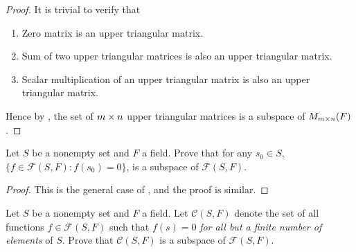 \begin{proof}
It is trivial to verify that
\begin{enumerate}
    \item Zero matrix is an upper triangular matrix.
    \item Sum of two upper triangular matrices is also an upper triangular matrix.
    \item Scalar multiplication of an upper triangular matrix is also an upper triangular matrix.
\end{enumerate}
Hence by , the set of \(m \times n\) upper triangular matrices is a subspace of \(M_{m \times n}(F)\).
\end{proof}

\begin{exercise} \label{exercise 1.3.13}
Let \(S\) be a nonempty set and \(F\) a field.
Prove that for any \(s_0 \in S\), \(\{ f \in \mathcal{F}(S, F) : f(s_0) = 0\}\), is a subspace of \(\mathcal{F}(S, F)\).
\end{exercise}

\begin{proof}
This is the general case of , and the proof is similar.
\end{proof}

\begin{exercise} \label{exercise 1.3.14}
Let \(S\) be a nonempty set and \(F\) a field.
Let \(\mathcal{C}(S, F)\) denote the set of all functions \(f \in \mathcal{F}(S, F)\) such that \(f(s) = 0\) \emph{for all but a finite number of elements} of \(S\).
Prove that \(\mathcal{C}(S, F)\) is a subspace of \(\mathcal{F}(S, F)\).
\end{exercise}

